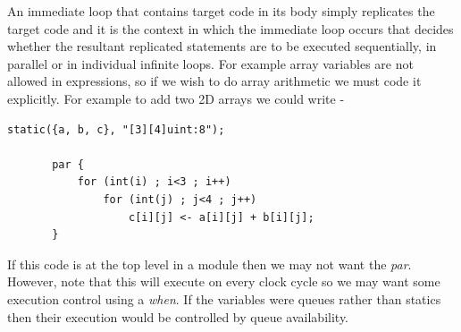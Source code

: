     An immediate loop that contains target code in its
    body simply replicates the target code and it is the context
    in which the immediate loop occurs that decides whether the
    resultant replicated statements are to be executed
    sequentially, in parallel or in individual infinite loops.
    For example array variables are not allowed in expressions, so if
    we wish to do array arithmetic we must code it explicitly. For example
    to add two 2D arrays we could write -
    \begin{lstlisting}[gobble=4, language=threepl]
       static({a, b, c}, "[3][4]uint:8");
       
       par {
           for (int(i) ; i<3 ; i++)
               for (int(j) ; j<4 ; j++)
                   c[i][j] <- a[i][j] + b[i][j];
       }
    \end{lstlisting}
    If this code is at the top level in a module then we may not want the {\em
    par}. However, note that this will execute on every clock cycle so we may
    want some execution control using a {\em when}. If the variables were
    queues rather than statics then their execution would be controlled by queue
    availability.
